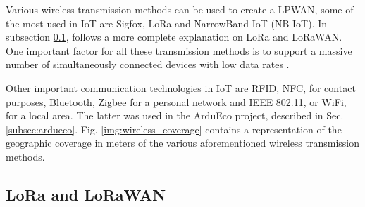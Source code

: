 		Various wireless transmission methods can be used to create a LPWAN, some of the most used in IoT are Sigfox, LoRa and NarrowBand IoT (NB-IoT).
		In subsection \ref{subsec:lora_lorawan}, follows a more complete explanation on LoRa and LoRaWAN.
		One important factor for all these transmission methods is to support a massive number of simultaneously connected devices with low data rates \cite{fi12030046}.
		
		Other important communication technologies in IoT are RFID, NFC, for contact purposes, Bluetooth, Zigbee for a personal network and IEEE 802.11, or WiFi, for a local area.
		The latter was used in the ArduEco project, described in Sec. \ref{subsec:ardueco}.
		Fig. \ref{img:wireless_coverage} contains a representation of the geographic coverage in meters of the various aforementioned wireless transmission methods.
	
		\subsection{LoRa and LoRaWAN}\label{subsec:lora_lorawan}
		
			
			
						
		
